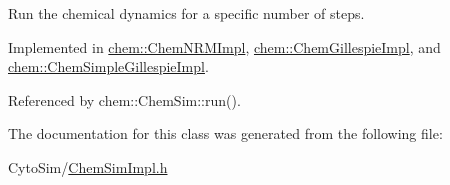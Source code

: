 Run the chemical dynamics for a specific number of steps. 



Implemented in \hyperlink{classchem_1_1ChemNRMImpl_a236b68389599aa9486959377cfc51496}{chem\-::\-Chem\-N\-R\-M\-Impl}, \hyperlink{classchem_1_1ChemGillespieImpl_a5822d60fd10e7c7374150e55c23da075}{chem\-::\-Chem\-Gillespie\-Impl}, and \hyperlink{classchem_1_1ChemSimpleGillespieImpl_a92ac6288318e6bc6882759aac941fa4e}{chem\-::\-Chem\-Simple\-Gillespie\-Impl}.



Referenced by chem\-::\-Chem\-Sim\-::run().



The documentation for this class was generated from the following file\-:\begin{DoxyCompactItemize}
\item 
Cyto\-Sim/\hyperlink{ChemSimImpl_8h}{Chem\-Sim\-Impl.\-h}\end{DoxyCompactItemize}
